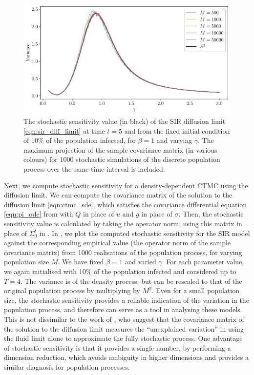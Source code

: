 \begin{figure}
	\begin{center}
		\includegraphics[width=\textwidth]{chp06_applications/figures/sir/sir_s2_R0}
		\caption{The stochastic sensitivity value (in black) of the SIR diffusion limit \cref{eqn:sir_diff_limit} at time \(t = 5\) and from the fixed initial condition of 10\% of the population infected, for \(\beta = 1\) and varying \(\gamma\).
			The maximum projection of the sample covariance matrix (in various colours) for \(1000\) stochastic simulations of the discrete population process over the same time interval is included.}
		\label{fig:sir_s2}
	\end{center}
\end{figure}

Next, we compute stochastic sensitivity for a density-dependent CTMC using the diffusion limit.
We can compute the covariance matrix of the solution to the diffusion limit \cref{eqn:ctmc_sde}, which satisfies the covariance differential equation \cref{eqn:pi_ode} from  with \(Q\) in place of \(u\) and \(g\) in place of \(\sigma\).
Then, the stochastic sensitivity value is calculated by taking the operator norm, using this matrix in place of \(\Sigma_0^t\) in .
In , we plot the computed stochastic sensitivity for the SIR model against the corresponding empirical value (the operator norm of the sample covariance matrix) from 1000 realisations of the population process, for varying population size \(M\).
We have fixed \(\beta = 1\) and varied \(\gamma\).
For each parameter value, we again initialised with 10\% of the population infected and considered up to \(T = 4\).
The variance is of the density process, but can be rescaled to that of the original population process by multiplying by \(M^2\).
Even for a small population size, the stochastic sensitivity provides a reliable indication of the variation in the population process, and therefore can serve as a tool in analysing these models.
This is not dissimilar to the work of \citet{PollettEtAl_2010_ModellingPopulationProcesses}, who suggest that the covariance matrix of the solution to the diffusion limit measures the ``unexplained variation'' in using the fluid limit alone to approximate the fully stochastic process.
One advantage of stochastic sensitivity is that it provides a single number, by performing a dimension reduction, which avoids ambiguity in higher dimensions and provides a similar diagnosis for population processes.


